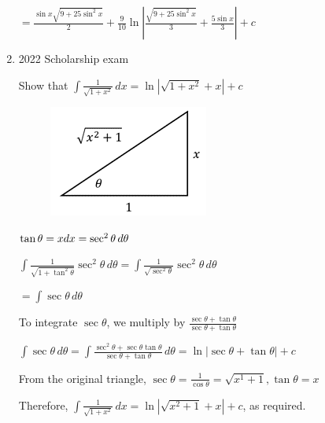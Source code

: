 \documentclass[../main.tex]{subfiles}
\begin{document}
\begin{enumerate}
    \(=\frac{\sin{x}\sqrt{9+25\sin^2{x}}}{2}+\frac{9}{10}\ln{|\frac{\sqrt{9+25\sin^2{x}}}{3}+\frac{5\sin{x}}{3}|+c}\)
    \pagebreak
    \item 2022 Scholarship exam
    
    Show that \(\int \frac{1}{\sqrt{1+x^2}}\,dx=\ln{|\sqrt{1+x^2}+x|}+c\)
    \begin{figure}[h]
        \includegraphics{images/trigsuba12.png}
    \end{figure}

    \(\tan{\theta}=x\\
    dx=\sec^2{\theta}\,d\theta\)

    \(\int \frac{1}{\sqrt{1+\tan^2{\theta}}}\sec^2{\theta}\,d\theta=\int \frac{1}{\sqrt{\sec^2{\theta}}}\sec^2{\theta}\,d\theta\)

    \(=\int \sec{\theta}\,d\theta\)

    To integrate \(\sec{\theta}\), we multiply by \(\frac{\sec{\theta}+\tan{\theta}}{\sec{\theta}+\tan{\theta}}\)

    \(\int \sec{\theta}\,d\theta=\int \frac{\sec^2{\theta}+\sec{\theta}\tan{\theta}}{\sec{\theta}+\tan{\theta}}\,d\theta=\ln{|\sec{\theta}+\tan{\theta}|}+c\)

    From the original triangle, \(\sec{\theta}=\frac{1}{\cos{\theta}}=\sqrt{x^1+1}, \tan{\theta}=x\)

    Therefore, \(\int \frac{1}{\sqrt{1+x^2}}\,dx=\ln{|\sqrt{x^2+1}+x|}+c\), as required.
    
\end{enumerate}


\pagebreak
\end{document}
